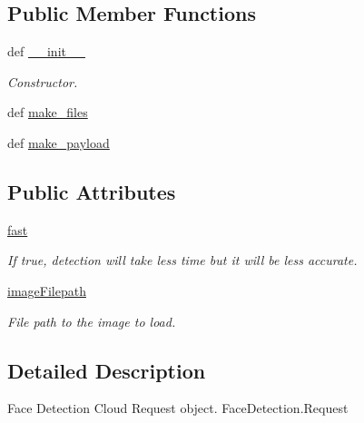 \subsection*{Public Member Functions}
\begin{DoxyCompactItemize}
\item 
def \hyperlink{classRappCloud_1_1CloudMsgs_1_1FaceDetection_1_1FaceDetection_1_1Request_a7d624e189f3569cb6aa38e78bd2b462b}{\-\_\-\-\_\-init\-\_\-\-\_\-}
\begin{DoxyCompactList}\small\item\em Constructor. \end{DoxyCompactList}\item 
def \hyperlink{classRappCloud_1_1CloudMsgs_1_1FaceDetection_1_1FaceDetection_1_1Request_a0b23a07893bc1fab8606a4a6697b9be9}{make\-\_\-files}
\item 
def \hyperlink{classRappCloud_1_1CloudMsgs_1_1FaceDetection_1_1FaceDetection_1_1Request_aebe0c5c6a0ed8ba40fdfe14d9dfb4118}{make\-\_\-payload}
\end{DoxyCompactItemize}
\subsection*{Public Attributes}
\begin{DoxyCompactItemize}
\item 
\hyperlink{classRappCloud_1_1CloudMsgs_1_1FaceDetection_1_1FaceDetection_1_1Request_aa6fb29e9a44590fc56206af28ec0beda}{fast}
\begin{DoxyCompactList}\small\item\em If true, detection will take less time but it will be less accurate. \end{DoxyCompactList}\item 
\hyperlink{classRappCloud_1_1CloudMsgs_1_1FaceDetection_1_1FaceDetection_1_1Request_a680201dcc6a8cabb7d8d82439174ecb8}{image\-Filepath}
\begin{DoxyCompactList}\small\item\em File path to the image to load. \end{DoxyCompactList}\end{DoxyCompactItemize}


\subsection{Detailed Description}
\begin{DoxyVerb}Face Detection Cloud Request object. FaceDetection.Request \end{DoxyVerb}
 

